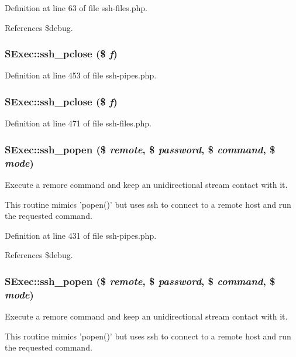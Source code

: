 Definition at line 63 of file ssh-files.php.

References \$debug.
\subsubsection{\setlength{\rightskip}{0pt plus 5cm}SExec::ssh\_\-pclose (\$ {\em f})}\label{classSExec_a20}




Definition at line 453 of file ssh-pipes.php.
\subsubsection{\setlength{\rightskip}{0pt plus 5cm}SExec::ssh\_\-pclose (\$ {\em f})}\label{classSExec_a10}




Definition at line 471 of file ssh-files.php.
\subsubsection{\setlength{\rightskip}{0pt plus 5cm}SExec::ssh\_\-popen (\$ {\em remote}, \$ {\em password}, \$ {\em command}, \$ {\em mode})}\label{classSExec_a19}


Execute a remore command and keep an unidirectional stream contact with it. 

This routine mimics 'popen()' but uses ssh to connect to a remote host and run the requested command. 

Definition at line 431 of file ssh-pipes.php.

References \$debug.
\subsubsection{\setlength{\rightskip}{0pt plus 5cm}SExec::ssh\_\-popen (\$ {\em remote}, \$ {\em password}, \$ {\em command}, \$ {\em mode})}\label{classSExec_a9}


Execute a remore command and keep an unidirectional stream contact with it. 

This routine mimics 'popen()' but uses ssh to connect to a remote host and run the requested command. 

